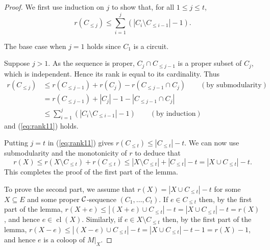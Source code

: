 \documentclass{daj}
\DeclareMathOperator{\cl}{cl}
\begin{document}
\begin{proof}

We  first use  induction on $j$ to show that, for all $1\leq j\leq t$,
\begin{equation}
\label{eq:rank11}
r(C_{\leq j})\leq \sum_{i=1}^j (|C_i\setminus C_{\leq i-1}|-1).
\end{equation}

The base case when $j=1$ holds since $C_1$ is a circuit.

Suppose $j>1$. As the sequence is proper,
$C_j\cap C_{\leq j-1}$ is a proper subset of $C_j$, which is independent.
Hence its rank is equal to its cardinality.
Thus
\begin{align*}
r(C_{\leq j})&\leq r(C_{\leq j-1})+r(C_j)-r(C_{\leq j-1}\cap C_j)  \qquad (\text{by submodularity}) \\
&= r(C_{\leq j-1})+|C_j|-1-|C_{\leq j-1}\cap C_j|  \\
&\leq \sum_{i=1}^j (|C_i\setminus C_{\leq i-1}|-1) \qquad (\text{by induction})
\end{align*}
and (\ref{eq:rank11}) holds.

Putting $j=t$ in (\ref{eq:rank11}) gives $r(C_{\leq t})\leq |C_{\leq t}|-t$.
We can now use submodularity and the monotonicity of $r$ to deduce that
\[
r(X)\leq r(X\setminus C_{\leq t})+r(C_{\leq t})
\leq |X\setminus C_{\leq t}|+|C_{\leq t}|-t=|X\cup C_{\leq t}|-t.
\]
This completes the proof of the first part of the lemma.

To prove the second part, we assume that $r(X)=|X\cup C_{\leq t}|-t$ for some $X\subseteq E$ and some proper $\cal C$-sequence $(C_1,\ldots,C_t)$.
If $e\in C_{\leq t}$
then, by the first part of the lemma,
$r(X+e)\leq |(X+e)\cup C_{\leq t}|-t=|X\cup C_{\leq t}|-t=r(X)$,
and hence  $e\in \cl(X)$. Similarly,
if $e\in X\setminus C_{\leq t}$
then, by the first part of the lemma,
$r(X-e)\leq  |(X-e)\cup C_{\leq t}|-t= |X\cup C_{\leq t}|-t-1=r(X)-1$,
and hence  $e$ is a coloop of
$M|_X$.
\end{proof}
\end{document}
